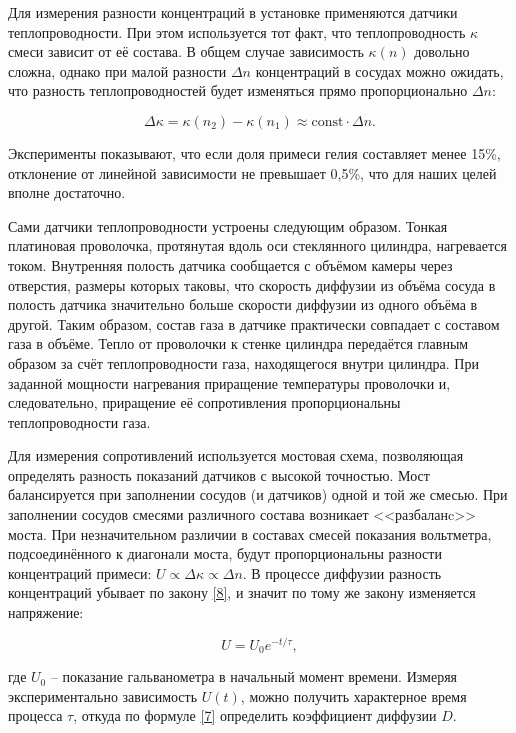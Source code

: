 \documentclass[a4paper,12pt]{article} %
\begin{document}
\medskip

\noindent Для измерения разности концентраций в установке применяются датчики теплопроводности. При этом используется тот факт, что теплопроводность $ \kappa $ смеси зависит от её состава. В общем случае зависимость $ \kappa(n) $ довольно сложна, однако при малой разности $ \Delta n $ концентраций в сосудах можно ожидать, что разность теплопроводностей будет изменяться прямо пропорционально $ \Delta n $:

\[ \Delta \kappa = \kappa(n_2)-\kappa(n_1)\approx\text{const}\cdot\Delta n. \]

\noindent Эксперименты показывают, что если доля примеси гелия составляет менее 15\%, отклонение от линейной зависимости не превышает 0,5\%, что для наших целей вполне достаточно.

\medskip

\noindent Сами датчики теплопроводности устроены следующим образом. Тонкая платиновая проволочка, протянутая вдоль оси стеклянного цилиндра, нагревается током. Внутренняя полость датчика сообщается с объёмом камеры через отверстия, размеры которых таковы, что скорость диффузии из объёма сосуда в полость датчика значительно больше скорости диффузии из одного объёма в другой. Таким образом, состав газа в датчике практически совпадает с составом газа в объёме. Тепло от проволочки к стенке цилиндра передаётся главным образом за счёт теплопроводности газа, находящегося внутри цилиндра. При заданной мощности нагревания приращение температуры проволочки и, следовательно, приращение её сопротивления пропорциональны теплопроводности газа.

\medskip

\noindent Для измерения сопротивлений используется мостовая схема, позволяющая определять разность показаний датчиков с высокой точностью. Мост балансируется при заполнении сосудов (и датчиков) одной и той же смесью. При заполнении сосудов смесями различного состава возникает <<разбаланc>> моста. При незначительном различии в составах смесей показания вольтметра, подсоединённого к диагонали моста, будут пропорциональны разности концентраций примеси: $ U\propto\Delta\kappa\propto\Delta n $. В процессе диффузии разность концентраций убывает по закону \eqref{8}, и значит по тому же закону изменяется напряжение:

\begin{equation}\label{10}
U=U_0e^{-t/\tau},
\end{equation}

\noindent где $ U_0 $ -- показание гальванометра в начальный момент времени. Измеряя экспериментально зависимость $ U(t) $, можно получить характерное время
процесса $ \tau $, откуда по формуле \eqref{7} определить коэффициент диффузии $ D $.
\end{document}
